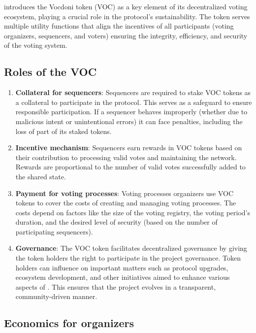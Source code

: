 
\Davinci introduces the Vocdoni token (VOC) as a key element of its decentralized voting ecosystem, playing a crucial role in the protocol's sustainability.
The token serves multiple utility functions that align the incentives of all participants (voting organizers, sequencers, and voters) ensuring the integrity, efficiency, and security of the voting system.

\subsection{Roles of the VOC}

\begin{enumerate}
	\item \textbf{Collateral for sequencers}: Sequencers are required to stake VOC tokens as a collateral to participate in the protocol. This serves as a safeguard to ensure responsible participation. If a sequencer behaves improperly (whether due to malicious intent or unintentional errors) it can face penalties, including the loss of part of its staked tokens.
	\item \textbf{Incentive mechanism}: Sequencers earn rewards in VOC tokens based on their contribution to processing valid votes and maintaining the network. Rewards are proportional to the number of valid votes successfully added to the shared state.
	\item \textbf{Payment for voting processes}: Voting processes organizers use VOC tokens to cover the costs of creating and managing voting processes. The costs depend on factors like the size of the voting registry, the voting period's duration, and the desired level of security (based on the number of participating sequencers).
	\item \textbf{Governance}: The VOC token facilitates decentralized governance by giving the token holders the right to participate in the project governance. Token holders can influence on important matters such as protocol upgrades, ecosystem development, and other initiatives aimed to enhance various aspects of \davinci. This ensures that the project evolves in a transparent, community-driven manner.
\end{enumerate}

\subsection{Economics for organizers}

